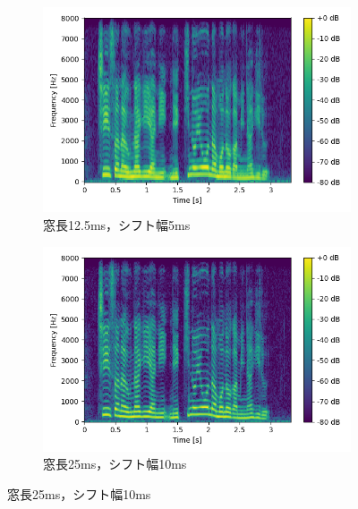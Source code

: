 \begin{figure}[tb]
    \centering
    \begin{subfigure}[b]{0.48\textwidth}
        \centering
        \includegraphics[width=\textwidth]{./figure/sec2/spectrogram_1.png}
        \caption{窓長12.5ms，シフト幅5ms}
        \label{sec2:fig:spectrogram1}
    \end{subfigure}
    \begin{subfigure}[b]{0.48\textwidth}
        \centering
        \includegraphics[width=\textwidth]{./figure/sec2/spectrogram_2.png}
        \caption{窓長25ms，シフト幅10ms}
        \label{sec2:fig:spectrogram2}
    \end{subfigure}

    \vspace{0.5cm}


\end{figure}
